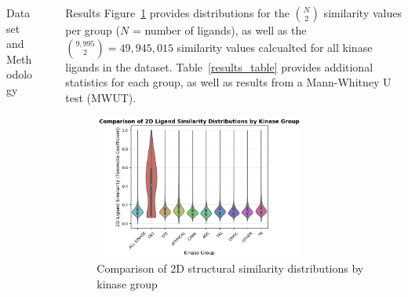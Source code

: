 \documentclass[final]{beamer}
\newlength{\sepwidth}
\newlength{\colwidth}
\newcommand{\separatorcolumn}{\begin{column}{\sepwidth}\end{column}}
\begin{document}
\begin{frame}[t]
\begin{columns}[t]
\begin{column}{\colwidth}
\begin{block}{Dataset and Methodology}
 

  \end{block}
\end{column}

\separatorcolumn

\begin{column}{\colwidth}

  \begin{block}{Results}
    \small
    Figure~\ref{violin_plot} provides distributions for the ${N\choose 2}$ similarity values per group ($N$ = number of ligands), as well as the ${9,995 \choose 2} = 49,945,015$ similarity values calcualted for all kinase ligands in the dataset. Table~\ref{results_table} provides additional statistics for each group, as well as results from a Mann-Whitney U test (MWUT).
    \begin{figure}
        \centering
        \includegraphics[width=0.75\textwidth]{../figures/violin_plot.png}
        \caption{Comparison of 2D structural similarity distributions by kinase group}
        \label{violin_plot}
    \end{figure}
    

\end{block}
\end{column}
\end{columns}
\end{frame}
\end{document}
